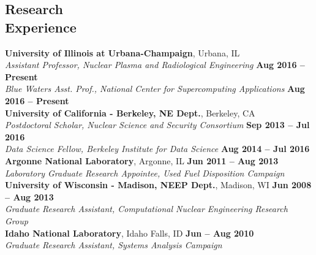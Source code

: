\documentclass[margin,line]{resume}
\newcommand{\Cyclus}{\textsc{Cyclus}\xspace}%
\begin{document}
\begin{resume}
    \section{\mysidestyle Research\\Experience}
    \textbf{University of Illinois at Urbana-Champaign}, Urbana, IL\\
		\textsl{Assistant Professor, Nuclear Plasma and Radiological Engineering} \hfill \textbf{Aug 2016 -- Present}\\
		\textsl{Blue Waters Asst. Prof., National Center for 
                Supercomputing Applications} \hfill \textbf{Aug 2016 -- 
                Present}\vspace{2mm}\\
    \textbf{University of California - Berkeley, NE Dept.}, Berkeley, CA \\
		\textsl{Postdoctoral Scholar, Nuclear Science and Security Consortium} \hfill \textbf{Sep 2013 -- Jul 2016}\\
		\textsl{Data Science Fellow, Berkeley Institute for Data 
                Science} \hfill \textbf{Aug 2014 -- Jul 2016}\vspace{2mm}\\
    \textbf{Argonne National Laboratory}, Argonne, IL \hfill \textbf{Jun 2011 -- Aug 2013}\\
		\textsl{Laboratory Graduate Research Appointee, Used Fuel 
                Disposition Campaign}\vspace{2mm}\\
    \textbf{University of Wisconsin - Madison, NEEP Dept.}, Madison, WI \hfill \textbf{Jun 2008 -- Aug 2013}\\
		\textsl{Graduate Research Assistant, Computational Nuclear 
                Engineering Research Group}\vspace{2mm}\\
    \textbf{Idaho National Laboratory}, Idaho Falls, ID \hfill \textbf{Jun -- Aug 2010}\\
		\textsl{Graduate Research Assistant, Systems Analysis 
                Campaign}\vspace{2mm}\\

\end{resume}
\end{document}
